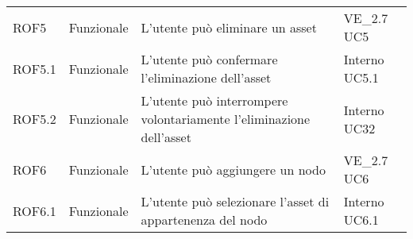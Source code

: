 \begin{longtable}{p{2cm}!{\VRule[1pt]}p{2cm}!{\VRule[1pt]}p{5cm}!{\VRule[1pt]}p{1.5cm}}
	ROF5                             & Funzionale\newline               & L'utente può eliminare un asset                                                                                          & VE_2.7 \newline UC5          
	\\
	ROF5.1                           & Funzionale\newline               & L'utente può confermare l'eliminazione dell'asset                                                                        & Interno \newline UC5.1       
	\\
	ROF5.2                           & Funzionale\newline               & L'utente può interrompere volontariamente l'eliminazione dell'asset                                                      & Interno \newline UC32        
	\\
	ROF6                             & Funzionale\newline               & L'utente può aggiungere un nodo                                                                                          & VE_2.7 \newline UC6          
	\\
	ROF6.1                           & Funzionale\newline               & L'utente può selezionare l'asset di appartenenza del nodo                                                                & Interno \newline UC6.1       
	\\


\end{longtable}
